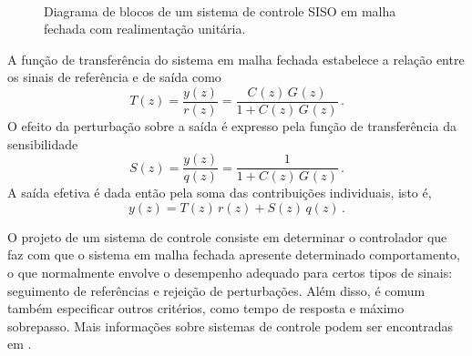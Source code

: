 \documentclass[repeatfields,oneside,overleaf]{tcc}
\newcommand{\mycdot}{ \, }
\newcommand{\myC}[2][]{ C_{#1} \left( #2 \right) }
\newcommand{\myG}[2][]{ G_{#1} \left( #2 \right) }
\newcommand{\myCG}[3][]{ \myC[#1]{#2} \mycdot \myG[#1]{#3} }
\begin{document}
\begin{figure}[h]
    \centering
    \caption{Diagrama de blocos de um sistema de controle SISO em malha fechada com realimentação unitária.}
    \\
    \label{fig:feedbackloop}
\end{figure}

A função de transferência do sistema em malha fechada estabelece a relação entre os sinais de referência e de saída como
\begin{equation}\label{eq:T_loop}
    T(z) = \dfrac{ y(z) }{ r(z) } = \dfrac{ \myCG{z}{z} }{ 1 + \myCG{z}{z} }
    \,.
\end{equation}
O efeito da perturbação sobre a saída é expresso pela função de transferência da sensibilidade
\begin{equation}\label{eq:T_loop_qy}
    S(z) = \dfrac{ y(z) }{ q(z) } = \dfrac{ 1 }{ 1 + \myCG{z}{z} }
    \,.
\end{equation}
A saída efetiva é dada então pela soma das contribuições individuais, isto é,
\begin{equation}
    y(z) = T(z) \mycdot r(z) + S(z) \mycdot q(z)
    \,.
\end{equation}

O projeto de um sistema de controle consiste em determinar o controlador que faz com que o sistema em malha fechada apresente determinado comportamento, o que normalmente envolve o desempenho adequado para certos tipos de sinais: seguimento de referências e rejeição de perturbações.
Além disso, é comum também especificar outros critérios, como tempo de resposta e máximo sobrepasso.
Mais informações sobre sistemas de controle podem ser encontradas em \cite{Bazanella2005, Ogata2010}.
\end{document}
